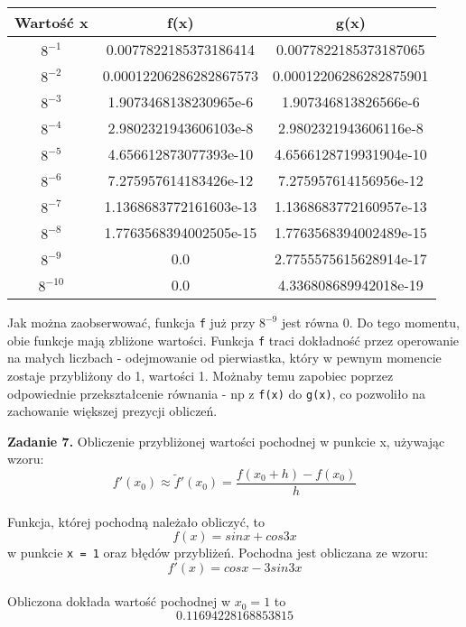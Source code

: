 \documentclass[15pt, a4paper]{article}
\begin{document}
\begin{table}[ht]
    \begin{tabular}{|c|c|c|}
        \hline 
        Wartość x & f(x) & g(x) \\ \hline
        $8^{\mathrm{-1}}$ & 0.0077822185373186414 & 0.0077822185373187065 \\ \hline
        $8^{\mathrm{-2}}$ & 0.00012206286282867573 & 0.00012206286282875901 \\ \hline
        $8^{\mathrm{-3}}$ & 1.9073468138230965e-6 & 1.907346813826566e-6 \\ \hline
        $8^{\mathrm{-4}}$ & 2.9802321943606103e-8 & 2.9802321943606116e-8 \\ \hline
        $8^{\mathrm{-5}}$ & 4.656612873077393e-10 & 4.6566128719931904e-10 \\ \hline
        $8^{\mathrm{-6}}$ & 7.275957614183426e-12 & 7.275957614156956e-12 \\ \hline
        $8^{\mathrm{-7}}$ & 1.1368683772161603e-13 & 1.1368683772160957e-13 \\ \hline
        $8^{\mathrm{-8}}$ & 1.7763568394002505e-15 & 1.7763568394002489e-15 \\ \hline
        $8^{\mathrm{-9}}$ & 0.0 & 2.7755575615628914e-17 \\ \hline
        $8^{\mathrm{-10}}$ & 0.0 & 4.336808689942018e-19 \\ \hline
    \end{tabular}
    \label{tab:fvsg}
\end{table}

Jak można zaobserwować, funkcja \verb|f| już przy $8^{-9}$ jest równa 0. Do tego momentu, obie funkcje mają zbliżone wartości. Funkcja \verb|f| traci dokładność przez operowanie na małych liczbach - odejmowanie od pierwiastka, który w pewnym momencie zostaje przybliżony do 1, wartości 1. Możnaby temu zapobiec poprzez odpowiednie przekształcenie równania - np z \verb|f(x)| do \verb|g(x)|, co pozwoliło na zachowanie większej prezycji obliczeń.

\vspace{0.5cm}

\noindent\hrulefill


\vspace{0.5cm}

\noindent\textbf{Zadanie 7.} Obliczenie przybliżonej wartości pochodnej w punkcie x, używając wzoru: \\
\[f'(x_0) \approx \tilde{f}'(x_0) = \frac{f(x_0 + h) - f(x_0)}{h}\] \\
Funkcja, której pochodną należało obliczyć, to 
\[f(x) = sinx + cos3x\]
w punkcie \verb|x = 1| oraz błędów przybliżeń. Pochodna jest obliczana ze wzoru:
\[f'(x) = cosx - 3sin3x \] \\
Obliczona dokłada wartość pochodnej w $x_0 = 1$ to
\[0.11694228168853815\]
\end{document}
